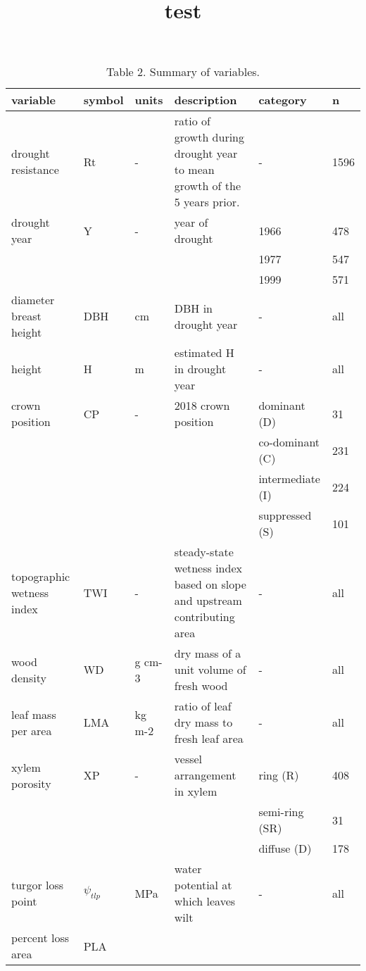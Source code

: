 \documentclass[
]{article}
\title{test}
\author{}
\date{\vspace{-2.5em}}
\begin{document}
\maketitle

\begin{table}

\caption{\label{tab:Table 2}Table 2. Summary of variables.}
\centering
\begin{tabular}[t]{llllll}
\toprule
variable & symbol & units & description & category & n\\
\midrule
drought resistance & Rt & - & ratio of growth during drought year to mean growth of the 5 years prior. & - & 1596\\
drought year & Y & - & year of drought & 1966 & 478\\
 &  &  &  & 1977 & 547\\
 &  &  &  & 1999 & 571\\
diameter breast height & DBH & cm & DBH in drought year & - & all\\
\addlinespace
height & H & m & estimated H in drought year & - & all\\
crown position & CP & - & 2018 crown position & dominant (D) & 31\\
 &  &  &  & co-dominant (C) & 231\\
 &  &  &  & intermediate (I) & 224\\
 &  &  &  & suppressed (S) & 101\\
\addlinespace
topographic wetness index & TWI & - & steady-state wetness index based on slope and upstream contributing area & - & all\\
wood density & WD & g cm-3 & dry mass of a unit volume of fresh wood & - & all\\
leaf mass per area & LMA & kg m-2 & ratio of leaf dry mass to fresh leaf area & - & all\\
xylem porosity & XP & - & vessel arrangement in xylem & ring (R) & 408\\
 &  &  &  & semi-ring (SR) & 31\\
\addlinespace
 &  &  &  & diffuse (D) & 178\\
turgor loss point & $\psi_{tlp}$ & MPa & water potential at which leaves wilt & - & all\\
percent loss area & PLA & %
\bottomrule
\end{tabular}
\end{table}
\end{document}
